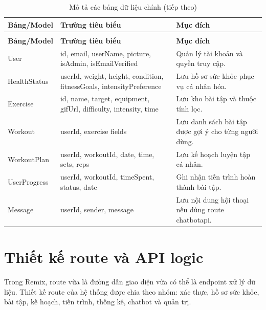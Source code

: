 \begingroup
\setlength{\tabcolsep}{3pt}
\renewcommand{\arraystretch}{1.25}
\begin{longtable}{|P{0.220\textwidth}|P{0.330\textwidth}|P{0.370\textwidth}|}
\caption{Mô tả các bảng dữ liệu chính}\\
\hline
\textbf{Bảng/Model} & \textbf{Trường tiêu biểu} & \textbf{Mục đích} \\
\hline
\endfirsthead
\caption[]{Mô tả các bảng dữ liệu chính (tiếp theo)}\\
\hline
\textbf{Bảng/Model} & \textbf{Trường tiêu biểu} & \textbf{Mục đích} \\
\hline
\endhead
User & id, email, userName, picture, isAdmin, isEmailVerified & Quản lý tài khoản và quyền truy cập. \\
\hline
HealthStatus & userId, weight, height, condition, fitnessGoals, intensityPreference & Lưu hồ sơ sức khỏe phục vụ cá nhân hóa. \\
\hline
Exercise & id, name, target, equipment, gifUrl, difficulty, intensity, time & Lưu kho bài tập và thuộc tính lọc. \\
\hline
Workout & userId, exercise fields & Lưu danh sách bài tập được gợi ý cho từng người dùng. \\
\hline
WorkoutPlan & userId, workoutId, date, time, sets, reps & Lưu kế hoạch luyện tập cá nhân. \\
\hline
UserProgress & userId, workoutId, timeSpent, status, date & Ghi nhận tiến trình hoàn thành bài tập. \\
\hline
Message & userId, sender, message & Lưu nội dung hội thoại nếu dùng route chatbotapi. \\
\hline
\end{longtable}
\endgroup

\section{Thiết kế route và API logic}

Trong Remix, route vừa là đường dẫn giao diện vừa có thể là endpoint xử lý dữ liệu. Thiết kế route của hệ thống được chia theo nhóm: xác thực, hồ sơ sức khỏe, bài tập, kế hoạch, tiến trình, thống kê, chatbot và quản trị.


